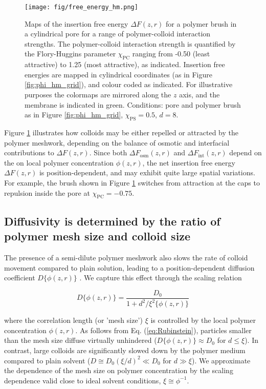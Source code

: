 \documentclass[12pt, a4paper]{article}
\begin{document}
\begin{figure}
    \centering
    \texttt{[image: fig/free\_energy\_hm.png]}
    \caption{
    Maps of the insertion free energy $\Delta F(z,r)$ for a polymer brush in a cylindrical pore for a range of polymer-colloid interaction strengths. 
    The polymer-colloid interaction strength is quantified by the Flory-Huggins parameter $\chi_{\text{PC}}$ ranging from -0.50 (least attractive) to 1.25 (most attractive), as indicated. 
    Insertion free energies are mapped in cylindrical coordinates (as in Figure \ref{fig:phi_hm_grid}), and colour coded as indicated. 
    For illustrative purposes the colormaps are mirrored along the $z$ axis, and the membrane is indicated in green. 
    Conditions: pore and polymer brush as in Figure \ref{fig:phi_hm_grid}, $\chi_{\text{PS}}=0.5$, $d=8$.
    }
    \label{fig:DeltaF_map}
\end{figure}

Figure \ref{fig:DeltaF_map} illustrates how colloids may be either repelled or attracted by the polymer meshwork, 
depending on the balance of osmotic and interfacial contributions to $\Delta F(z,r)$. 
Since both $\Delta F_{\text{osm}}(z,r)$ and $\Delta F_{\text{int}}(z,r)$ depend on the on local polymer concentration $\phi(z,r)$, 
the net insertion free energy $\Delta F(z,r)$ is position-dependent, and may exhibit quite large spatial variations. 
For example, the brush shown in Figure \ref{fig:DeltaF_map} switches from attraction at the caps to repulsion inside the pore at $\chi_{\text{PC}}=-0.75$.


\subsection{Diffusivity is determined by the ratio of polymer mesh size and colloid size}

The presence of a semi-dilute polymer meshwork also slows the rate of colloid movement compared to plain solution, leading to a position-dependent diffusion coefficient $D\{\phi(z,r)\}$ \cite{Laktionov2023}. 
We capture this effect through the scaling relation

\begin{equation}
    D\{\phi(z,r)\} = \frac{D_0}{1+d^2/\xi^{2}\{\phi(z,r)\}}
    \label{eq:Rubinstein}
\end{equation}

\noindent where the correlation length (or 'mesh size') $\xi$ is controlled by the local polymer concentration $\phi(z,r)$. 
As follows from Eq. (\ref{eq:Rubinstein}), particles smaller than the mesh size diffuse virtually unhindered ($D\{\phi(z,r)\}\approx D_0$ for $d\leq \xi$). 
In contrast, large colloids are significantly slowed down by the polymer medium compared to plain solvent ($D\cong D_0 (\xi/d)^2\ll D_0$ for $d\gg \xi$). 
We approximate the dependence of the mesh size on polymer concentration by the scaling dependence valid close to ideal solvent conditions, $\xi\cong \phi^{-1}$. 
\end{document}
